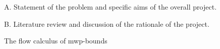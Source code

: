 A. Statement of the problem and specific aims of the overall project.

\noindent B. Literature review and discussion of the rationale of the project.

\noindent
The flow calculus of mwp-bounds~\cite{jones2009}
